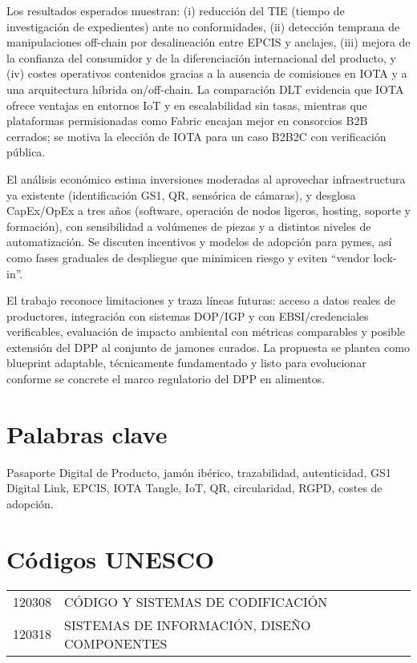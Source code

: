 Los resultados esperados muestran: (i) reducción del TIE (tiempo de investigación de expedientes) ante no conformidades, (ii) detección temprana de manipulaciones off-chain por desalineación entre EPCIS y anclajes, (iii) mejora de la confianza del consumidor y de la diferenciación internacional del producto, y (iv) costes operativos contenidos gracias a la ausencia de comisiones en IOTA y a una arquitectura híbrida on/off-chain. La comparación DLT evidencia que IOTA ofrece ventajas en entornos IoT y en escalabilidad sin tasas, mientras que plataformas permisionadas como Fabric encajan mejor en consorcios B2B cerrados; se motiva la elección de IOTA para un caso B2B2C con verificación pública.

El análisis económico estima inversiones moderadas al aprovechar infraestructura ya existente (identificación GS1, QR, sensórica de cámaras), y desglosa CapEx/OpEx a tres años (software, operación de nodos ligeros, hosting, soporte y formación), con sensibilidad a volúmenes de piezas y a distintos niveles de automatización. Se discuten incentivos y modelos de adopción para pymes, así como fases graduales de despliegue que minimicen riesgo y eviten “vendor lock-in”.

El trabajo reconoce limitaciones y traza líneas futuras: acceso a datos reales de productores, integración con sistemas DOP/IGP y con EBSI/credenciales verificables, evaluación de impacto ambiental con métricas comparables y posible extensión del DPP al conjunto de jamones curados. La propuesta se plantea como blueprint adaptable, técnicamente fundamentado y listo para evolucionar conforme se concrete el marco regulatorio del DPP en alimentos.

\section*{Palabras clave}

Pasaporte Digital de Producto, jamón ibérico, trazabilidad, autenticidad, GS1 Digital Link, EPCIS, IOTA Tangle, IoT, QR, circularidad, RGPD, costes de adopción.

\section*{Códigos UNESCO}

\noindent
\begin{tabular}{ll}
    120308 & CÓDIGO Y SISTEMAS DE CODIFICACIÓN \\
    120318 & SISTEMAS DE INFORMACIÓN, DISEÑO COMPONENTES
\end{tabular}